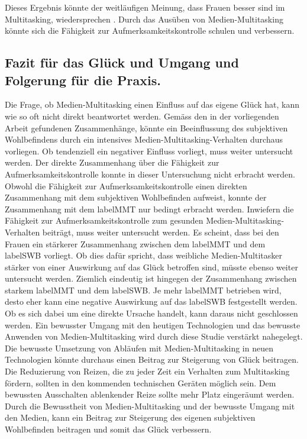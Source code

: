 Dieses Ergebnis könnte der weitläufigen Meinung, dass Frauen besser sind im Multitasking, wiedersprechen \cite{Oconnell2002}. Durch das Ausüben von Medien-Multitasking könnte sich die Fähigkeit zur Aufmerksamkeitskontrolle schulen und verbessern.

\subsection{Fazit für das Glück und Umgang und Folgerung für die Praxis.}
Die Frage, ob Medien-Multitasking einen Einfluss auf das eigene Glück hat, kann wie so oft nicht direkt beantwortet werden. Gemäss den in der vorliegenden Arbeit gefundenen Zusammenhänge, könnte ein Beeinflussung des subjektiven Wohlbefindens durch ein intensives Medien-Multitasking-Verhalten durchaus vorliegen. Ob tendenziell ein negativer Einfluss vorliegt, muss weiter untersucht werden. Der direkte Zusammenhang über die Fähigkeit zur Aufmerksamkeitskontrolle konnte in dieser Untersuchung nicht erbracht werden. Obwohl die Fähigkeit zur Aufmerksamkeitskontrolle einen direkten Zusammenhang mit dem subjektiven Wohlbefinden aufweist, konnte der Zusammenhang mit dem \gls{labelMMT} nur bedingt erbracht werden. Inwiefern die Fähigkeit zur Aufmerksamkeitskontrolle zum gesunden Medien-Multitasking-Verhalten beiträgt, muss weiter untersucht werden. Es scheint, dass bei den Frauen ein stärkerer Zusammenhang zwischen dem \gls{labelMMT} und dem \gls{labelSWB} vorliegt. Ob dies dafür spricht, dass weibliche Medien-Multitasker stärker von einer Auswirkung auf das Glück betroffen sind, müsste ebenso weiter untersucht werden. Ziemlich eindeutig ist hingegen der Zusammenhang zwischen starkem \gls{labelMMT} und dem \gls{labelSWB}. Je mehr \gls{labelMMT}  betrieben wird, desto eher kann eine negative Auswirkung auf das \gls{labelSWB} festgestellt werden. Ob es sich dabei um eine direkte Ursache handelt, kann daraus nicht geschlossen werden. Ein bewusster Umgang mit den heutigen Technologien und das bewusste Anwenden von Medien-Multitasking wird durch diese Studie verstärkt nahegelegt. Die bewusste Umsetzung von Abläufen mit Medien-Multitasking in neuen Technologien könnte durchaus einen Beitrag zur Steigerung von Glück beitragen. Die Reduzierung von Reizen, die zu jeder Zeit ein Verhalten zum Multitasking fördern, sollten in den kommenden technischen Geräten möglich sein. Dem bewussten Ausschalten ablenkender Reize sollte mehr Platz eingeräumt werden. Durch die Bewusstheit von Medien-Multitasking und der bewusste Umgang mit den Medien, kann ein Beitrag zur Steigerung des eigenen subjektiven Wohlbefinden beitragen und somit das Glück verbessern.

